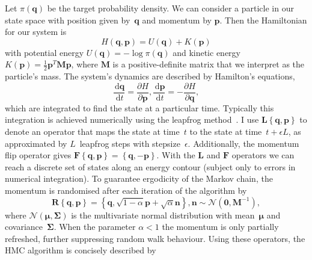 \documentclass{article}
\newcommand{\dd}{\, \mathrm{d}}
\renewcommand{\vec}[1]{\ensuremath{\boldsymbol{\mathbf{#1}}}}
\newcommand{\mat}[1]{\ensuremath{\boldsymbol{\mathbf{#1}}}}
\newcommand{\op}[1]{\ensuremath{\boldsymbol{\mathbf{#1}}}}
\newcommand{\norm}[1]{\ensuremath{\mathcal{N}\left(#1\right)}}
\begin{document}
    Let $\pi\left(\vec{q}\right)$ be the target probability density.
    We can consider a particle in our state space with position given
        by~$\vec{q}$ and momentum by $\vec{p}$.
    Then the Hamiltonian for our system is
        \begin{equation}
            H\left(\vec{q},\vec{p}\right)
            = U\left(\vec{q}\right) + K\left(\vec{p}\right)
        \end{equation}
        with potential energy
        $U\left(\vec{q}\right) = -\log{\pi\left(\vec{q}\right)}$ and kinetic
        energy $K\left(\vec{p}\right) = \frac{1}{2} \vec{p}^T \mat{M} \vec{p}$,
        where $\mat{M}$ is a positive-definite matrix that we interpret as
        the particle's mass.
    The system's dynamics are described by Hamilton's equations,
        \begin{equation}
            \frac{\dd \vec{q}}{\dd t} = \frac{\partial H}{\partial \vec{p}},
            \frac{\dd \vec{p}}{\dd t} = -\frac{\partial H}{\partial \vec{q}},
        \end{equation}
        which are integrated to find the state at a particular time.
    Typically this integration is achieved numerically using the leapfrog
        method~\cite{Nea11}.
    I use $\op{L}\left\{\vec{q},\vec{p}\right\}$ to denote an operator that
        maps the state at time~$t$ to the state at time~$t + \epsilon L$, as
        approximated by $L$~leapfrog steps with stepsize~$\epsilon$.
    Additionally, the momentum flip operator gives
        $\op{F}\left\{\vec{q},\vec{p}\right\}
         = \left\{\vec{q},-\vec{p}\right\}$.
    With the $\op{L}$ and $\op{F}$ operators we can reach a discrete set of
        states along an energy contour (subject only to errors in numerical
        integration).
    To guarantee ergodicity of the Markov chain, the momentum is randomised
        after each iteration of the algorithm by
        \begin{equation}
            \op{R}\left\{\vec{q},\vec{p}\right\} =
            \left\{\vec{q}, \sqrt{1-\alpha}\vec{p} + \sqrt{\alpha}\vec{n}\right\},
            \vec{n} \sim \norm{\vec{0}, \mat{M}^{-1}},
        \end{equation}
        where $\norm{\vec{\mu},\mat{\Sigma}}$ is the multivariate
        normal distribution with mean~$\vec{\mu}$ and covariance~$\mat{\Sigma}$.
    When the parameter $\alpha < 1$ the momentum is only partially refreshed,
        further suppressing random walk behaviour.
    Using these operators, the \ac{HMC} algorithm is concisely described by
\end{document}
